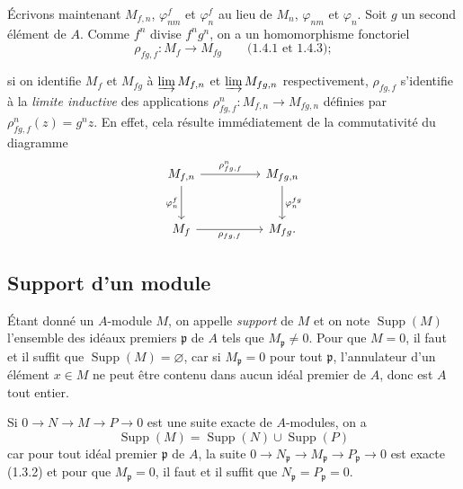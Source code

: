 \begin{env}[1.6.2]
\label{0.1.6.2-fr}
Écrivons maintenant $M_{f,n}$, $\varphi_{nm}^f$ et $\varphi_n^f$ au lieu de
$M_n$, $\varphi_{nm}$ et $\varphi_n$. Soit $g$ un second élément de $A$. Comme
$f^n$ divise $f^ng^n$, on a un homomorphisme fonctoriel
\[
  \rho_{fg,f}:M_f\longrightarrow M_{fg}\qquad\text{(1.4.1 et 1.4.3)};
\]


si on identifie $M_f$ et $M_{fg}$ à $\varinjlim M_{f,n}$ et
$\varinjlim M_{fg,n}$ respectivement, $\rho_{fg,f}$ s'identifie à la
\emph{limite inductive} des applications
$\rho_{fg,f}^n:M_{f,n}\to M_{fg,n}$ définies par
$\rho_{fg,f}^n(z)=g^nz$. En effet, cela résulte immédiatement de la
commutativité du diagramme
\[
\begin{tikzcd}[column sep=huge,row sep=large]
M_{f,n} \arrow[r,"\rho_{fg,f}^n"] \arrow[d,"\varphi_n^f"']
  & M_{fg,n} \arrow[d,"\varphi_n^{fg}"] \\
M_f \arrow[r,"\rho_{fg,f}"']
  & M_{fg}.
\end{tikzcd}
\]
\end{env}

\subsection{Support d'un module}
\label{subsection:0.1.7-fr}

\begin{env}[1.7.1]
\label{0.1.7.1-fr}
Étant donné un $A$-module $M$, on appelle \emph{support} de $M$ et on note
$\operatorname{Supp}(M)$ l'ensemble des idéaux premiers $\mathfrak p$ de $A$
tels que $M_{\mathfrak p}\neq0$. Pour que $M=0$, il faut et il suffit que
$\operatorname{Supp}(M)=\varnothing$, car si $M_{\mathfrak p}=0$ pour tout
$\mathfrak p$, l'annulateur d'un élément $x\in M$ ne peut être contenu dans
aucun idéal premier de $A$, donc est $A$ tout entier.
\end{env}

\begin{env}[1.7.2]
\label{0.1.7.2-fr}
Si $0\to N\to M\to P\to0$ est une suite exacte de $A$-modules, on a
\[
  \operatorname{Supp}(M)=\operatorname{Supp}(N)\cup\operatorname{Supp}(P)
\]
car pour tout idéal premier $\mathfrak p$ de $A$, la suite
$0\to N_{\mathfrak p}\to M_{\mathfrak p}\to P_{\mathfrak p}\to0$ est exacte
(1.3.2) et pour que $M_{\mathfrak p}=0$, il faut et il suffit que
$N_{\mathfrak p}=P_{\mathfrak p}=0$.
\end{env}


